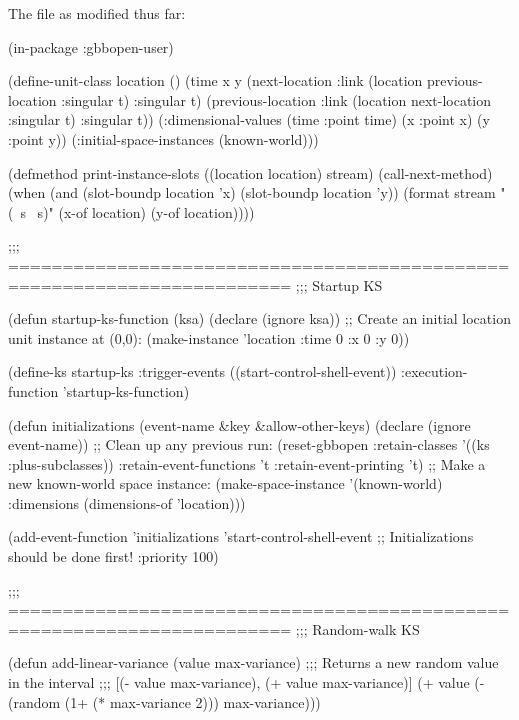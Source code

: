 \documentclass[10pt,twoside,english,pdftex]{article}
\begin{document}
\begin{tightitemize}
\item The  file as modified thus far:

\begin{example}
  (in-package :gbbopen-user)

  (define-unit-class location ()
    (time 
     x y
     (next-location
      :link (location previous-location :singular t) 
      :singular t)
     (previous-location
      :link (location next-location :singular t)  
      :singular t))
    (:dimensional-values
      (time :point time)
      (x :point x)
      (y :point y))
    (:initial-space-instances (known-world)))

  (defmethod print-instance-slots ((location location) stream)
    (call-next-method)
    (when (and (slot-boundp location 'x)
               (slot-boundp location 'y))
      (format stream " (~s ~s)"
              (x-of location)
              (y-of location))))

  ;;; ========================================================================
  ;;;   Startup KS

  (defun startup-ks-function (ksa)
    (declare (ignore ksa))
    ;; Create an initial location unit instance at (0,0):
    (make-instance 'location :time 0 :x 0 :y 0))

  (define-ks startup-ks
      :trigger-events ((start-control-shell-event))
      :execution-function 'startup-ks-function)

  (defun initializations (event-name &key &allow-other-keys)
    (declare (ignore event-name))
    ;; Clean up any previous run:
    (reset-gbbopen :retain-classes '((ks :plus-subclasses))
                   :retain-event-functions 't
                   :retain-event-printing 't)
    ;; Make a new known-world space instance:
    (make-space-instance 
     '(known-world)
     :dimensions (dimensions-of 'location)))

  (add-event-function 'initializations 'start-control-shell-event
                      ;; Initializations should be done first!
                      :priority 100)

  ;;; ========================================================================
  ;;;   Random-walk KS

  (defun add-linear-variance (value max-variance)
    ;;; Returns a new random value in the interval
    ;;; [(- value max-variance), (+ value max-variance)]
    (+ value (- (random (1+ (* max-variance 2))) max-variance)))


\end{example}
\end{tightitemize}
\end{document}
